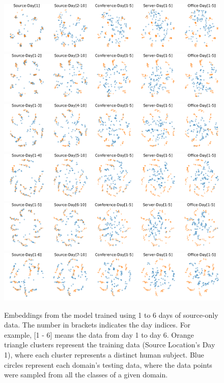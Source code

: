\documentclass{article}
\begin{document}
\begin{figure}[H]
\includegraphics[width=\linewidth]{figures_supp/TargetLabelled100.png} 
\includegraphics[width=\linewidth]{figures_supp/TargetLabelled200.png} 
\includegraphics[width=\linewidth]{figures_supp/TargetLabelled300.png} 
\includegraphics[width=\linewidth]{figures_supp/TargetLabelled400.png} 
\includegraphics[width=\linewidth]{figures_supp/TargetLabelled500.png} 
\includegraphics[width=\linewidth]{figures_supp/TargetLabelled600.png} 
\caption{Embeddings from the model trained using 1 to 6 days of source-only data. The number in brackets indicates the day indices. For example, [1 - 6] means the data from day 1 to day 6. Orange triangle clusters represent the training data (Source Location's Day 1), where each cluster represents a distinct human subject. Blue circles represent each domain’s testing data, where the data points were sampled from all the classes of a given domain. }
\label{scr1}
\end{figure}
\end{document}
